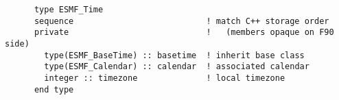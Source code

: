 \begin{verbatim}
      type ESMF_Time
      sequence                           ! match C++ storage order
      private                            !   (members opaque on F90 side)
        type(ESMF_BaseTime) :: basetime  ! inherit base class
        type(ESMF_Calendar) :: calendar  ! associated calendar
        integer :: timezone              ! local timezone
      end type
\end{verbatim}
